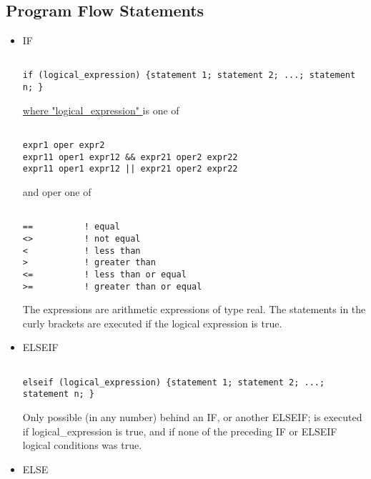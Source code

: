 




\subsection{Program Flow Statements}


\begin{itemize}
	\item IF
\begin{verbatim}

if (logical_expression) {statement 1; statement 2; ...; statement n; }
\end{verbatim}\href{logical}{ where "logical\_expression" } is one of 
\begin{verbatim}

expr1 oper expr2
expr11 oper1 expr12 && expr21 oper2 expr22
expr11 oper1 expr12 || expr21 oper2 expr22
\end{verbatim} and oper one of 
\begin{verbatim}

==          ! equal
<>          ! not equal
<           ! less than
>           ! greater than
<=          ! less than or equal
>=          ! greater than or equal
\end{verbatim} The expressions are arithmetic expressions of type real. The statements in the curly brackets are executed if the logical expression is true. 


	\item ELSEIF%
\begin{verbatim}

elseif (logical_expression) {statement 1; statement 2; ...; statement n; }
\end{verbatim} Only possible (in any number) behind an IF, or another ELSEIF; is executed if  logical\_expression is true, and if none of the preceding IF or ELSEIF logical conditions was true. 


	\item ELSE%
\begin{verbatim}


\end{verbatim}
\end{itemize}
